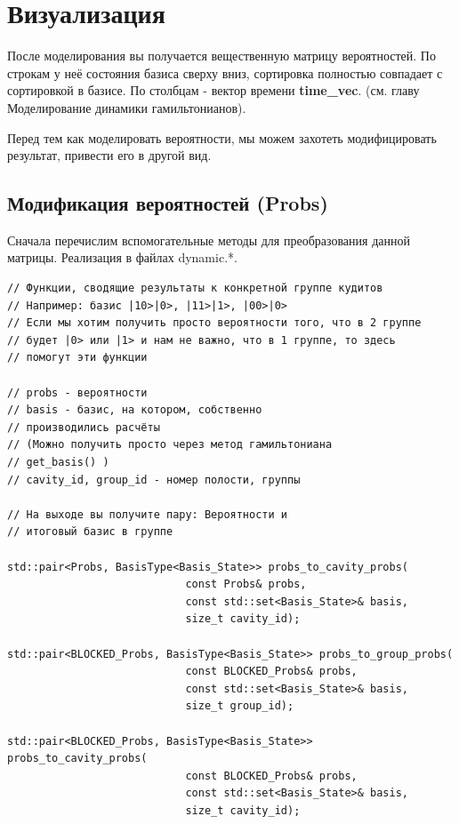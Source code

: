 \documentclass[12pt,fleqn]{article}
\begin{document}
    \section{Визуализация}

    После моделирования вы получается вещественную матрицу вероятностей. По строкам у неё состояния базиса сверху вниз, сортировка полностью совпадает с сортировкой в базисе.
    По столбцам - вектор времени \textbf{time\_vec}. (см. главу Моделирование динамики гамильтонианов).

    Перед тем как моделировать вероятности, мы можем захотеть модифицировать результат, привести его в другой вид. 

    \subsection{Модификация вероятностей (\textbf{Probs})}

    Сначала перечислим вспомогательные методы для преобразования данной матрицы. Реализация в файлах \textsf{dynamic.*}.

\begin{mdframed}[linecolor=black, topline=true, bottomline=true,
    leftline=false, rightline=false]
\begin{verbatim}
// Функции, сводящие результаты к конкретной группе кудитов
// Например: базис |10>|0>, |11>|1>, |00>|0>
// Если мы хотим получить просто вероятности того, что в 2 группе 
// будет |0> или |1> и нам не важно, что в 1 группе, то здесь
// помогут эти функции

// probs - вероятности
// basis - базис, на котором, собственно
// производились расчёты
// (Можно получить просто через метод гамильтониана
// get_basis() )
// cavity_id, group_id - номер полости, группы

// На выходе вы получите пару: Вероятности и
// итоговый базис в группе

std::pair<Probs, BasisType<Basis_State>> probs_to_cavity_probs(
                            const Probs& probs,
                            const std::set<Basis_State>& basis,
                            size_t cavity_id);

std::pair<BLOCKED_Probs, BasisType<Basis_State>> probs_to_group_probs(
                            const BLOCKED_Probs& probs,
                            const std::set<Basis_State>& basis,
                            size_t group_id);

std::pair<BLOCKED_Probs, BasisType<Basis_State>> probs_to_cavity_probs(
                            const BLOCKED_Probs& probs,
                            const std::set<Basis_State>& basis,
                            size_t cavity_id);
\end{verbatim}
\end{mdframed}
\end{document}
